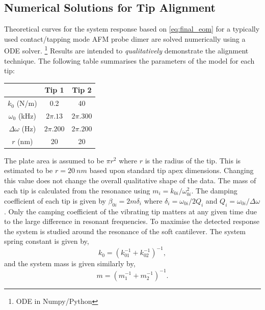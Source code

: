 \documentclass{article}
\begin{document}
\subsection{Numerical Solutions for Tip Alignment}

Theoretical curves for the system response based on \eqref{eq:final_eom} for a typically used contact/tapping mode AFM probe dimer are solved numerically using a ODE solver.%
\footnote{ODE in Numpy/Python}
Results are intended to \textit{qualitatively} demonstrate the alignment technique.
The following table summarises the parameters of the model for each tip:
\begin{center}
\begin{tabular}{c | c | c}
\hline
& \textbf{Tip 1} & \textbf{Tip 2} \\
\hline                 
$k_0$ (N/m) & 0.2 & 40 \\
$\omega_0$ (kHz) & $2\pi.13$ & $2\pi.300$ \\
$\Delta\omega$ (Hz) & $2\pi.200$ & $2\pi.200$ \\
$r$ (nm) & 20 & 20 \\
\hline 
\end{tabular}
\end{center}
The plate area is assumed to be $\pi r^2$ where $r$ is the radius of the tip. This is estimated to be $r=\SI{20}{nm}$ based upon standard tip apex dimensions. Changing this value does not change the overall qualitative shape of the data. The mass of each tip is calculated from the resonance using $m_i = k_{0i}/\omega_{0i}^2$. The damping coefficient of each tip is given by $\beta_{0i} = 2m\delta_i$ where $\delta_i = \omega_{0i}/2Q_i$ and $Q_i = \omega_{0i}/\Delta\omega$. Only the camping coefficient of the vibrating tip matters at any given time due to the large difference in resonant frequencies. To maximise the detected response the system is studied around the resonance of the soft cantilever.
The system spring constant is given by,
\begin{equation}
	k_0 = \left( k_{01}^{-1} + k_{02}^{-1} \right)^{-1},
\end{equation}
and the system mass is given similarly by,
\begin{equation}
	m = \left( m_1^{-1} + m_2^{-1} \right)^{-1}.
\end{equation}
\end{document}
